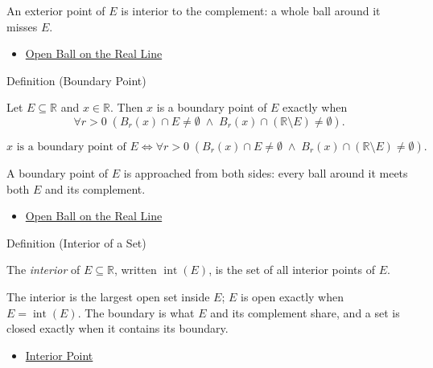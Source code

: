 \begin{remark*}[Interpretation]
An exterior point of $E$ is interior to the complement: a whole ball around it misses $E$.
\end{remark*}
\begin{dependencies}
\begin{itemize}
  \item \hyperref[def:open-ball]{Open Ball on the Real Line}
\end{itemize}
\end{dependencies}
\begin{definitionbox}{Definition (Boundary Point)}
\begin{definition}
\label{def:boundary-point}
Let $E\subseteq\mathbb{R}$ and $x\in\mathbb{R}$. Then $x$ is a boundary point of $E$ exactly when
\[
\forall r>0\;(B_{r}(x)\cap E\neq\emptyset \;\land\; B_{r}(x)\cap(\mathbb{R}\setminus E)\neq\emptyset).
\]
\end{definition}
\end{definitionbox}
\begin{remark*}
\[
x \text{ is a boundary point of } E \Longleftrightarrow \forall r>0\;(B_{r}(x)\cap E\neq\emptyset \;\land\; B_{r}(x)\cap(\mathbb{R}\setminus E)\neq\emptyset).
\]
\end{remark*}
\begin{remark*}[Interpretation]
A boundary point of $E$ is approached from both sides: every ball around it meets both $E$ and its complement.
\end{remark*}
\begin{dependencies}
\begin{itemize}
  \item \hyperref[def:open-ball]{Open Ball on the Real Line}
\end{itemize}
\end{dependencies}
\begin{definitionbox}{Definition (Interior of a Set)}
\begin{definition}
\label{def:interior-of-set}
The \emph{interior} of $E\subseteq\mathbb{R}$, written $\operatorname{int}(E)$, is the set of all interior points of $E$.
\end{definition}
\end{definitionbox}
\begin{remark*}[Interpretation]
The interior is the largest open set inside $E$; $E$ is open exactly when $E=\operatorname{int}(E)$. The boundary is what $E$ and its complement share, and a set is closed exactly when it contains its boundary.
\end{remark*}
\begin{dependencies}
\begin{itemize}
  \item \hyperref[def:interior-point]{Interior Point}
\end{itemize}
\end{dependencies}
